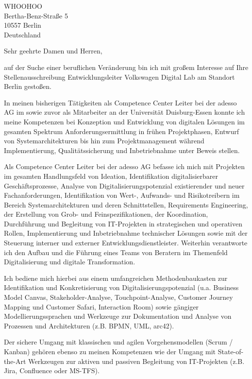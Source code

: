 \documentclass[10pt,a4paper]{dinbrief}
\date{\today}
\begin{document}
 
\begin{letter}  
{%
	WHOOHOO\\
	Bertha-Benz-Straße 5\\
	10557 Berlin\\
	Deutschland
}
\subject{\bf Bewerbung Entwicklungsleiter Volkswagen Digital Lab}
\opening{Sehr geehrte Damen und Herren,}
auf der Suche einer beruflichen Veränderung bin ich mit großem Interesse auf Ihre Stellenausschreibung Entwicklungsleiter Volkswagen Digital Lab am Standort Berlin gestoßen. 

In meinen bisherigen Tätigkeiten als Competence Center Leiter bei der adesso AG im sowie zuvor als Mitarbeiter an der Universität Duisburg-Essen konnte ich meine Kompetenzen bei Konzeption und Entwicklung von digitalen Lösungen im gesamten Spektrum Anforderungsermittlung in frühen Projektphasen, Entwurf von Systemarchitekturen bis hin zum Projektmanagement während Implementierung, Qualitätssicherung und Inbetriebnahme unter Beweis stellen.

Als Competence Center Leiter bei der adesso AG befasse ich mich mit Projekten im gesamten Handlungsfeld von Ideation, Identifikation digitalisierbarer Geschäftsprozesse, Analyse von Digitalisierungspotenzial existierender und neuer Fachanforderungen, Identifikation von Wert-, Aufwands- und Risikotreibern im Bereich Systemarchitekturen und deren Schnittstellen, Requirements Engineering, der Erstellung von Grob- und Feinspezifikationen, der Koordination, Durchführung und Begleitung von IT-Projekten in strategischen und operativen Rollen, Implementierung und Inbetriebnahme technischer Lösungen sowie mit der Steuerung interner und externer Entwicklungsdienstleister. Weiterhin verantworte ich den Aufbau und die Führung eines Teams von Beratern im Themenfeld Digitalisierung und digitale Transformation.

Ich bediene mich hierbei aus einem umfangreichen Methodenbaukasten zur Identifikation und Konkretisierung von Digitalisierungspotenzial (u.a. Business Model Canvas, Stakeholder-Analyse, Touchpoint-Analyse, Customer Journey Mapping und Customer Safari, Interaction Room) sowie gängiger Modellierungssprachen und Werkzeuge zur Dokumentation und Analyse von Prozessen und Architekturen (z.B. BPMN, UML, arc42).

Der sichere Umgang mit klassischen und agilen Vorgehensmodellen (Scrum / Kanban) gehören ebenso zu meinen Kompetenzen wie der Umgang mit State-of-the-Art Werkzeugen zur aktiven und passiven Begleitung von IT-Projekten (z.B. Jira, Confluence oder MS-TFS). 


\end{letter}
\end{document}
